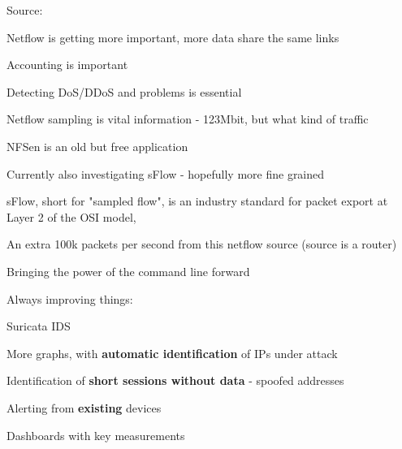 \documentclass[Screen16to9,17pt]{foils}
\begin{document}
Source: 



\begin{slidelist}
\item Netflow is getting more important, more data share the same links
\item Accounting is important
\item Detecting DoS/DDoS and problems is essential
\item Netflow sampling is vital information - 123Mbit, but what kind of traffic
\item NFSen is an old but free application
\item Currently also investigating sFlow - hopefully more fine grained
\item sFlow, short for "sampled flow", is an industry standard for packet export at Layer 2 of the OSI model, \\
\end{slidelist}






\centerline{An extra 100k packets per second from this netflow source (source is a router)}



\centerline{Bringing the power of the command line forward}



Always improving things:
\begin{list1}
\item Suricata IDS 
\item More graphs, with {\bf automatic identification} of IPs under attack
\item Identification of {\bf short sessions without data} - spoofed addresses
\item Alerting from {\bf existing} devices
\item Dashboards with key measurements
\end{list1}
\end{document}
